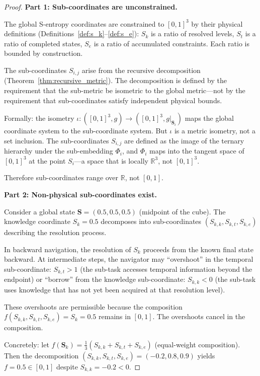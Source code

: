 \documentclass[12pt,twocolumn]{article}
\begin{document}
\begin{proof}
\textbf{Part 1: Sub-coordinates are unconstrained.}

The global S-entropy coordinates are constrained to $[0,1]^3$ by their physical definitions (Definitions~\ref{def:s_k}--\ref{def:s_e}): $S_k$ is a ratio of resolved levels, $S_t$ is a ratio of completed states, $S_e$ is a ratio of accumulated constraints. Each ratio is bounded by construction.

The sub-coordinates $S_{i,j}$ arise from the recursive decomposition (Theorem~\ref{thm:recursive_metric}). The decomposition is defined by the requirement that the sub-metric be isometric to the global metric---not by the requirement that sub-coordinates satisfy independent physical bounds.

Formally: the isometry $\iota: ([0,1]^3, g) \to ([0,1]^3, g|_{\mathbf{S}_i})$ maps the global coordinate system to the sub-coordinate system. But $\iota$ is a metric isometry, not a set inclusion. The sub-coordinates $S_{i,j}$ are defined as the image of the ternary hierarchy under the sub-embedding $\Phi_i$, and $\Phi_i$ maps into the tangent space of $[0,1]^3$ at the point $S_i$---a space that is locally $\mathbb{R}^3$, not $[0,1]^3$.

Therefore sub-coordinates range over $\mathbb{R}$, not $[0,1]$.

\textbf{Part 2: Non-physical sub-coordinates exist.}

Consider a global state $\mathbf{S} = (0.5, 0.5, 0.5)$ (midpoint of the cube). The knowledge coordinate $S_k = 0.5$ decomposes into sub-coordinates $(S_{k,k}, S_{k,t}, S_{k,e})$ describing the resolution process.

In backward navigation, the resolution of $S_k$ proceeds from the known final state backward. At intermediate steps, the navigator may ``overshoot'' in the temporal sub-coordinate: $S_{k,t} > 1$ (the sub-task accesses temporal information beyond the endpoint) or ``borrow'' from the knowledge sub-coordinate: $S_{k,k} < 0$ (the sub-task uses knowledge that has not yet been acquired at that resolution level).

These overshoots are permissible because the composition $f(S_{k,k}, S_{k,t}, S_{k,e}) = S_k = 0.5$ remains in $[0,1]$. The overshoots cancel in the composition.

Concretely: let $f(\mathbf{S}_k) = \frac{1}{3}(S_{k,k} + S_{k,t} + S_{k,e})$ (equal-weight composition). Then the decomposition $(S_{k,k}, S_{k,t}, S_{k,e}) = (-0.2, 0.8, 0.9)$ yields $f = 0.5 \in [0,1]$ despite $S_{k,k} = -0.2 < 0$.


\end{proof}
\end{document}
